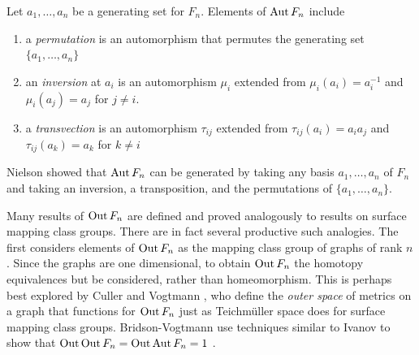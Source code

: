 Let $a_1,\ldots,a_n$ be a generating set for $F_n$.
Elements of $\operatorname{Aut} F_n$
include
\begin{enumerate}
  \item a \emph{permutation} is an
  automorphism that permutes the generating set $\{a_1,\ldots,a_n\}$
  \item an \emph{inversion} at $a_i$ is an automorphism $\mu_i$
  extended from $\mu_i( a_i ) = a_i^{-1}$ and $\mu_i( a_j) = a_j$ for $j \neq i$.
  \item a \emph{transvection}
  is an automorphism $\tau_{ij}$ extended from
  $\tau_{ij}( a_i )= a_ia_j$ and $\tau_{ij}( a_k)= a_k$
  for $k \neq i$
\end{enumerate}
Nielson \cite{Nielsen1924} showed that $\operatorname{Aut} F_n$
can be generated by taking any basis $a_1,\ldots, a_n$ of $F_n$
and taking an inversion, a transposition,
and the permutations of $\{a_1,\ldots, a_n\}$.



Many results of
$\operatorname{Out} F_n$
are defined and proved analogously to
results on surface mapping class groups.
There are in fact several productive such analogies.
The first considers
elements of $\operatorname{Out} F_n$
as the mapping class group of graphs of rank $n$.
Since the graphs are one dimensional, to obtain $\operatorname{Out} F_n$ the
homotopy equivalences but be considered, rather than homeomorphism.
This is perhaps best explored by
Culler and Vogtmann \cite{MR830040},
who define  the \emph{outer space} of metrics on a graph
that functions for $\operatorname{Out} F_n$ just as Teichm\"uller space
does for surface mapping class groups.
Bridson-Vogtmann use techniques similar to Ivanov to show that
$\operatorname{Out} \operatorname{Out} F_n = \operatorname{Out} \operatorname{Aut} F_n=1$
\cite{MR1769698}.

